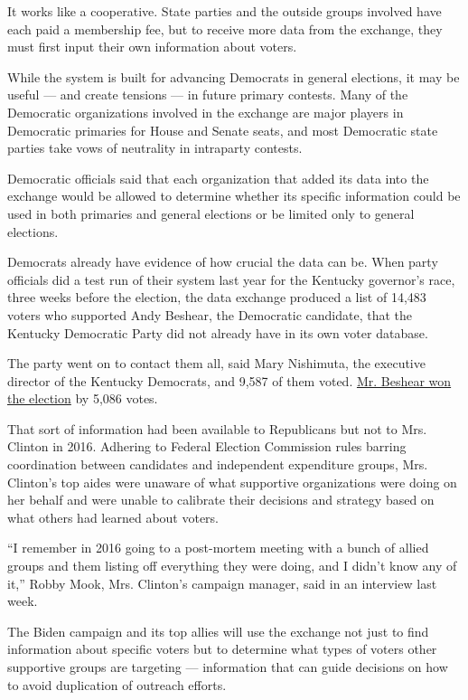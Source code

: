 It works like a cooperative. State parties and the outside groups
involved have each paid a membership fee, but to receive more data from
the exchange, they must first input their own information about voters.

While the system is built for advancing Democrats in general elections,
it may be useful --- and create tensions --- in future primary contests.
Many of the Democratic organizations involved in the exchange are major
players in Democratic primaries for House and Senate seats, and most
Democratic state parties take vows of neutrality in intraparty contests.

Democratic officials said that each organization that added its data
into the exchange would be allowed to determine whether its specific
information could be used in both primaries and general elections or be
limited only to general elections.

Democrats already have evidence of how crucial the data can be. When
party officials did a test run of their system last year for the
Kentucky governor's race, three weeks before the election, the data
exchange produced a list of 14,483 voters who supported Andy Beshear,
the Democratic candidate, that the Kentucky Democratic Party did not
already have in its own voter database.

The party went on to contact them all, said Mary Nishimuta, the
executive director of the Kentucky Democrats, and 9,587 of them voted.
\href{https://www.nytimes3xbfgragh.onion/interactive/2019/11/05/us/elections/results-kentucky-general-elections.html}{Mr.
Beshear won the election} by 5,086 votes.

That sort of information had been available to Republicans but not to
Mrs. Clinton in 2016. Adhering to Federal Election Commission rules
barring coordination between candidates and independent expenditure
groups, Mrs. Clinton's top aides were unaware of what supportive
organizations were doing on her behalf and were unable to calibrate
their decisions and strategy based on what others had learned about
voters.

``I remember in 2016 going to a post-mortem meeting with a bunch of
allied groups and them listing off everything they were doing, and I
didn't know any of it,'' Robby Mook, Mrs. Clinton's campaign manager,
said in an interview last week.

The Biden campaign and its top allies will use the exchange not just to
find information about specific voters but to determine what types of
voters other supportive groups are targeting --- information that can
guide decisions on how to avoid duplication of outreach efforts.

